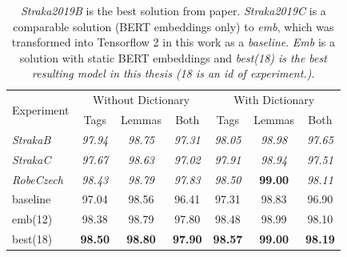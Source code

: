 \begin{table}[!h]
\centering
  \begin{tabular}{|l||ccc||ccc|}
  \hline
\multirow{2}{*}{Experiment} & \multicolumn{3}{c||}{Without Dictionary}  &
      \multicolumn{3}{c|}{With Dictionary} \\ 
    & Tags & Lemmas & Both & Tags & Lemmas & Both \\ \hline \hline
    \textit{StrakaB} & \textit{97.94} & \textit{98.75} & \textit{97.31} & \textit{98.05} & \textit{98.98} & \textit{97.65 }\\ \hline
   \textit{ StrakaC} & \textit{97.67} & \textit{98.63} & \textit{97.02} & \textit{97.91 }& \textit{98.94} & \textit{97.51} \\ \hline
     \textit{RobeCzech} & \textit{98.43} & \textit{98.79}  & \textit{97.83}  & \textit{98.50} & \textbf{99.00}  & \textit{98.11} \\ \hline \hline
      baseline & 97.04  & 98.56  & 96.41 &  97.31   & 98.83  & 96.90 \\ \hline 
    emb(12) & 98.38  &98.79  & 97.80 & 98.48  & 98.99 & 98.10 \\ \hline
    best(18) & \textbf{98.50}  & \textbf{98.80} &\textbf{ 97.90}  & \textbf{98.57}  & \textbf{99.00}  & \textbf{98.19}  \\ \hline  
  \end{tabular}
  \caption{%
  \textit{Straka2019B} is the best solution from \citep{Straka2019} paper. \textit{Straka2019C} is a comparable solution  (BERT embeddings only) to \textit{emb}, which was transformed into Tensorflow 2 in this work as a \textit{baseline}. \textit{Emb} is a solution with static BERT embeddings and \textit{best(18) is the best resulting model in this thesis (18 is an id of experiment.). }}
\label{tab:all_prew} 
\end{table}


